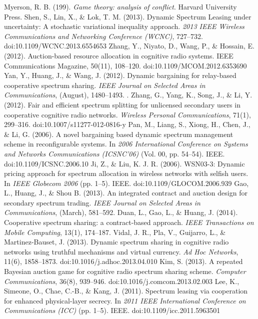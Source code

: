 \begin{thebibliography}{}
 Myerson, R. B. (199). \textit{Game theory: analysis of conflict}. Harvard University Press. 
 Shen, S., Lin, X., \& Lok, T. M. (2013). Dynamic Spectrum Leasing under uncertainty: A stochastic variational inequality approach. \textit{2013 IEEE Wireless Communications and Networking Conference (WCNC)}, 727–732. doi:10.1109/WCNC.2013.6554653
 Zhang, Y., Niyato, D., Wang, P., \& Hossain, E. (2012). Auction-based resource allocation in cognitive radio systems. IEEE Communications Magazine, 50(11), 108–120. doi:10.1109/MCOM.2012.6353690
 Yan, Y., Huang, J., \& Wang, J. (2012). Dynamic bargaining for relay-based cooperative spectrum sharing. \textit{IEEE Journal on Selected Areas in Communications}, (August), 1480–1493.
. Zhang, G., Yang, K., Song, J., \& Li, Y. (2012). Fair and efficient spectrum splitting for unlicensed secondary users in cooperative cognitive radio networks. \textit{Wireless Personal Communications}, 71(1), 299–316. doi:10.1007/s11277-012-0816-y
 Pan, M., Liang, S., Xiong, H., Chen, J., \& Li, G. (2006). A novel bargaining based dynamic spectrum management scheme in reconfigurable systems. In \textit{2006 International Conference on Systems and Networks Communications (ICSNC’06)} (Vol. 00, pp. 54–54). IEEE. doi:10.1109/ICSNC.2006.10
 Ji, Z., \& Liu, K. J. R. (2006). WSN03-3: Dynamic pricing approach for spectrum allocation in wireless networks with selfish users. In \textit{IEEE Globecom 2006} (pp. 1–5). IEEE. doi:10.1109/GLOCOM.2006.939
 Gao, L., Huang, J., \& Shou B. (2013). An integrated contract and auction design for secondary spectrum trading. \textit{IEEE Journal on Selected Areas in Communications}, (March), 581–592. 
 Duan, L., Gao, L., \& Huang, J. (2014). Cooperative spectrum sharing: a contract-based approach. \textit{IEEE Transactions on Mobile Computing}, 13(1), 174–187. 
 Vidal, J. R., Pla, V., Guijarro, L., \& Martinez-Bauset, J. (2013). Dynamic spectrum sharing in cognitive radio networks using truthful mechanisms and virtual currency. \textit{Ad Hoc Networks}, 11(6), 1858–1873. doi:10.1016/j.adhoc.2013.04.010
 Kim, S. (2013). A repeated Bayesian auction game for cognitive radio spectrum sharing scheme. \textit{Computer Communications}, 36(8), 939–946. doi:10.1016/j.comcom.2013.02.003
Lee, K., Simeone, O., Chae, C.-B., \& Kang, J. (2011). Spectrum leasing via cooperation for enhanced physical-layer secrecy. In \textit{2011 IEEE International Conference on Communications (ICC)} (pp. 1–5). IEEE. doi:10.1109/icc.2011.5963501

\end{thebibliography}

